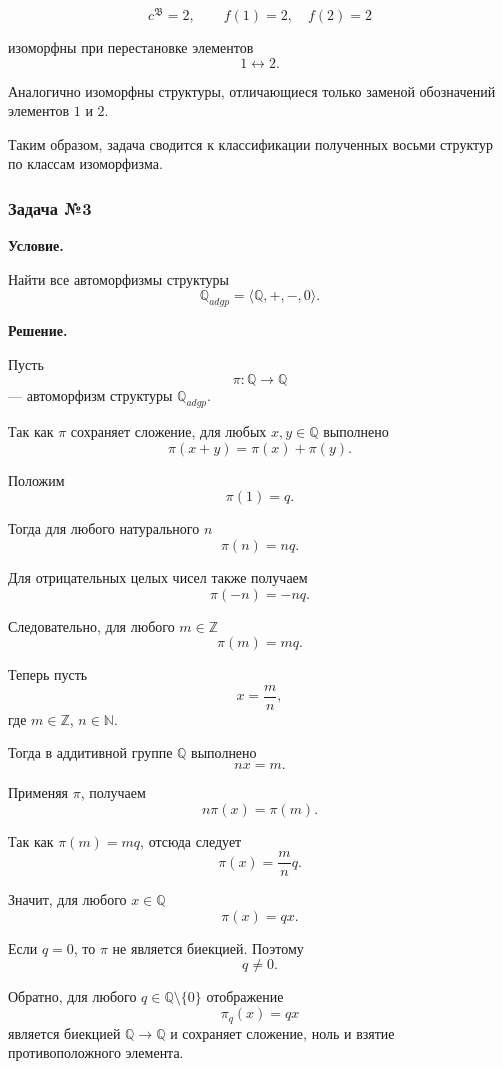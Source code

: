 \documentclass[12pt,a4paper,oneside,openany]{book}
\theoremstyle{definition}
\theoremstyle{plain}
\theoremstyle{remark}
\begin{document}
\[
c^{\mathfrak B}=2,
\qquad
f(1)=2,\quad f(2)=2
\]

изоморфны при перестановке элементов
\[
1\leftrightarrow2.
\]

Аналогично изоморфны структуры, отличающиеся только заменой обозначений элементов $1$ и $2$.

Таким образом, задача сводится к классификации полученных восьми структур по классам изоморфизма.

\subsubsection*{Задача №3}

\par\medskip
\textbf{Условие.}
\par\smallskip

Найти все автоморфизмы структуры
\[
\mathbb{Q}_{adgp}=\langle \mathbb{Q},+,-,0\rangle.
\]

\par\medskip
\textbf{Решение.}
\par\smallskip

Пусть
\[
\pi:\mathbb{Q}\to\mathbb{Q}
\]
— автоморфизм структуры $\mathbb{Q}_{adgp}$.

Так как $\pi$ сохраняет сложение, для любых $x,y\in\mathbb{Q}$ выполнено
\[
\pi(x+y)=\pi(x)+\pi(y).
\]

Положим
\[
\pi(1)=q.
\]

Тогда для любого натурального $n$
\[
\pi(n)=nq.
\]

Для отрицательных целых чисел также получаем
\[
\pi(-n)=-nq.
\]

Следовательно, для любого $m\in\mathbb{Z}$
\[
\pi(m)=mq.
\]

Теперь пусть
\[
x=\frac{m}{n},
\]
где $m\in\mathbb{Z}$, $n\in\mathbb{N}$.

Тогда в аддитивной группе $\mathbb{Q}$ выполнено
\[
nx=m.
\]

Применяя $\pi$, получаем
\[
n\pi(x)=\pi(m).
\]

Так как $\pi(m)=mq$, отсюда следует
\[
\pi(x)=\frac{m}{n}q.
\]

Значит, для любого $x\in\mathbb{Q}$
\[
\pi(x)=qx.
\]

Если $q=0$, то $\pi$ не является биекцией. Поэтому
\[
q\neq0.
\]

Обратно, для любого $q\in\mathbb{Q}\setminus\{0\}$ отображение
\[
\pi_q(x)=qx
\]
является биекцией $\mathbb{Q}\to\mathbb{Q}$ и сохраняет сложение, ноль и взятие противоположного элемента.
\end{document}
